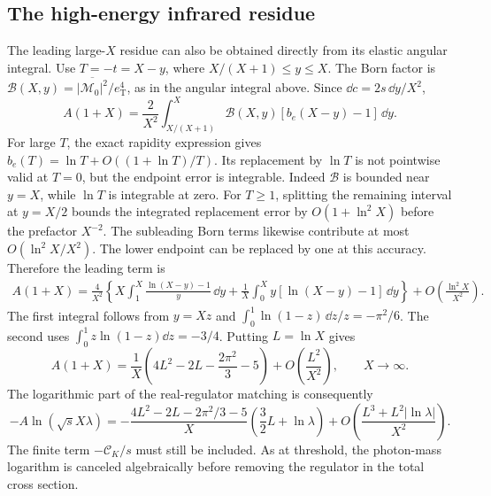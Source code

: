 \subsection{The high-energy infrared residue}
The leading large-$X$ residue can also be obtained directly from its
elastic angular integral.  Use $T=-t=X-y$, where
$X/(X+1)\leq y\leq X$.  The Born factor is
$\mathcal B(X,y)=\overline{|\mathcal M_0|^2}/e_{\mathrm T}^4$,
as in the angular integral above. Since $\dd c=2s\,\dd y/X^2$,
\begin{equation}
 A(1+X)=\frac2{X^2}\int_{X/(X+1)}^X
             \mathcal B(X,y)[b_e(X-y)-1]\,\dd y.
\end{equation}
For large $T$, the exact rapidity expression gives
$b_e(T)=\ln T+O((1+\ln T)/T)$.  Its replacement by $\ln T$ is not
pointwise valid at $T=0$, but the endpoint error is integrable.
Indeed $\mathcal B$ is bounded near $y=X$, while $\ln T$ is integrable at zero.
For $T\geq1$, splitting the remaining interval at $y=X/2$ bounds the
integrated replacement error by $O(1+\ln^2X)$ before the prefactor
$X^{-2}$.  The subleading Born terms likewise contribute at most
$O(\ln^2X/X^2)$.  The lower endpoint can be replaced by one at this
accuracy.  Therefore the leading term is
\begin{align}
 A(1+X)=\frac4{X^2}\left\{
 X\int_1^X\frac{\ln(X-y)-1}{y}\,\dd y
 +\frac1X\int_0^X y[\ln(X-y)-1]\,\dd y\right\}
 +O\!\left(\frac{\ln^2X}{X^2}\right).
\end{align}
The first integral follows from $y=Xz$ and
$\int_0^1\ln(1-z)\,\dd z/z=-\pi^2/6$.
The second uses $\int_0^1z\ln(1-z)\dd z=-3/4$.
Putting $L=\ln X$ gives
\begin{equation}
 A(1+X)=\frac1X\left(4L^2-2L-\frac{2\pi^2}{3}-5\right)
             +O\!\left(\frac{L^2}{X^2}\right),\qquad X\to\infty.
\end{equation}
The logarithmic part of the real-regulator matching is consequently
\begin{equation}
 -A\ln(\sqrt{s}X\lambda)
 =-\frac{4L^2-2L-2\pi^2/3-5}{X}
          \left(\frac32L+\ln\lambda\right)
 +O\!\left(\frac{L^3+L^2|\ln\lambda|}{X^2}\right).
\end{equation}
The finite term $-\mathcal C_K/s$ must still be included.  As at threshold,
the photon-mass logarithm is canceled algebraically before removing the
regulator in the total cross section.

